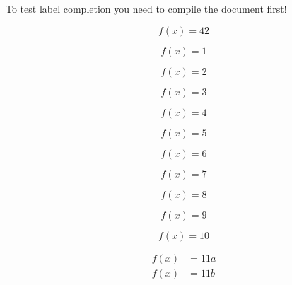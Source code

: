 \documentclass{article}
\begin{document}
To test label completion you need to compile the document first!

\begin{equation}
  f(x) = 42
  \label{eq:main-is-working}
\end{equation}







\begin{equation}
  \label{eq:test1}
  f(x) = 1
\end{equation}

\begin{equation}
  \label{eq:test2}
  f(x) = 2
\end{equation}

\begin{equation}
  \label{eq:test3}
  f(x) = 3
\end{equation}

\begin{equation}
  \label{eq:test4}
  f(x) = 4
\end{equation}

\begin{equation}
  \label{eq:test5}
  f(x) = 5
\end{equation}

\begin{equation}
  \label{eq:test6}
  f(x) = 6
\end{equation}

\begin{equation}
  \label{eq:test7}
  f(x) = 7
\end{equation}

\begin{equation}
  \label{eq:test8}
  f(x) = 8
\end{equation}

\begin{equation}
  \label{eq:test9}
  f(x) = 9
\end{equation}

\begin{equation}
  \label{eq:test10}
  f(x) = 10
\end{equation}

\begin{subequations}
  \begin{align}
    \label{eq:test11a}
    f(x) &= 11a \\
    \label{eq:test11b}
    f(x) &= 11b
  \end{align}
\end{subequations}

\newpage
\glsaddall
\printglossary[
  type=gloss,
  style=long,
  title={Glossary},
  toctitle={Glossary}
]
\printglossary[
  type=symbols,
  style=long,
  title={List of Symbols},
  toctitle={List of Symbols}
]
\end{document}
